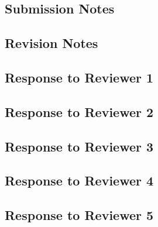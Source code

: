 \documentclass{article}
\newcommand{\header}[1]{%
  \begin{center}%
  \section*{{\Huge #1}}%
  \end{center}%
}
\begin{document}
  \linespread{1.4}\selectfont

  \header{Submission Notes}
  \vspace{1em}
  {\Large }

  \clearpage
  \header{Revision Notes}
  \vspace{1em}
  {\Large }

  \linespread{1}\selectfont

  \clearpage
  \header{Response to Reviewer 1}
  

  \clearpage
  \header{Response to Reviewer 2}
  

  \clearpage
  \header{Response to Reviewer 3}
  

  \clearpage
  \header{Response to Reviewer 4}
  

  \clearpage
  \header{Response to Reviewer 5}
  
\end{document}
